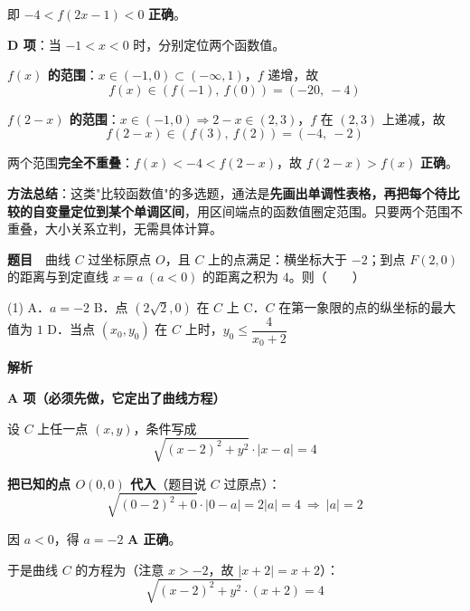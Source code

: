 即 $-4<f(2x-1)<0$  \textbf{正确}。

\par\medskip

\textbf{D 项}：当 $-1<x<0$ 时，分别定位两个函数值。

\textbf{$f(x)$ 的范围}：$x\in(-1,0)\subset(-\infty,1)$，$f$ 递增，故
\[f(x)\in\left(f(-1),\ f(0)\right)=(-20,\ -4)\]

\textbf{$f(2-x)$ 的范围}：$x\in(-1,0)\Rightarrow 2-x\in(2,3)$，$f$ 在 $(2,3)$ 上递减，故
\[f(2-x)\in\left(f(3),\ f(2)\right)=(-4,\ -2)\]

两个范围\textbf{完全不重叠}：$f(x)<-4<f(2-x)$，故 $f(2-x)>f(x)$  \textbf{正确}。


\begin{gktip}
\textbf{方法总结}：这类"比较函数值"的多选题，通法是\textbf{先画出单调性表格，再把每个待比较的自变量定位到某个单调区间}，用区间端点的函数值圈定范围。只要两个范围不重叠，大小关系立判，无需具体计算。
\end{gktip}

\par\medskip


\textbf{题目}　曲线 $C$ 过坐标原点 $O$，且 $C$ 上的点满足：横坐标大于 $-2$；到点 $F(2,0)$ 的距离与到定直线 $x=a\ (a<0)$ 的距离之积为 $4$。则（　　）

\begin{center}\end{center}

\begin{gkopts}(1)
\task A．$a=-2$
\task B．点 $\left(2\sqrt2,0\right)$ 在 $C$ 上
\task C．$C$ 在第一象限的点的纵坐标的最大值为 $1$
\task D．当点 $\left(x_0,y_0\right)$ 在 $C$ 上时，$y_0\le\dfrac{4}{x_0+2}$
\end{gkopts}

\textbf{解析}

\textbf{A 项（必须先做，它定出了曲线方程）}

设 $C$ 上任一点 $(x,y)$，条件写成
\[\sqrt{(x-2)^{2}+y^{2}}\cdot|x-a|=4\]

\textbf{把已知的点 $O(0,0)$ 代入}（题目说 $C$ 过原点）：
\[\sqrt{(0-2)^{2}+0}\cdot|0-a|=2|a|=4\ \Longrightarrow\ |a|=2\]

因 $a<0$，得 $a=-2$  \textbf{A 正确}。

于是曲线 $C$ 的方程为（注意 $x>-2$，故 $|x+2|=x+2$）：
\[\boxed{\sqrt{(x-2)^{2}+y^{2}}\cdot(x+2)=4}\]

